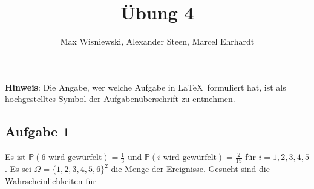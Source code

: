 \documentclass[11pt,a4paper,ngerman]{article}
\date{}
\title{Übung 4}
\author{Max Wisniewski\maxw, Alexander Steen\alex, Marcel Ehrhardt\marcel}
\newcommand{\set}[1]{ \{ #1 \}}
\newcommand{\Prob}{\mathbb{P}}
\begin{document}

\renewcommand{\figurename}{Figure}

\maketitle
\thispagestyle{fancy}

\begin{center}
\textbf{Hinweis}: Die Angabe, wer welche Aufgabe in \LaTeX\ formuliert hat, ist als hochgestelltes Symbol der Aufgabenüberschrift zu entnehmen.
\end{center}


\subsection*{Aufgabe 1}
Es ist $\Prob(\text{6 wird gewürfelt}) = \frac{1}{3}$ und $\Prob(\text{$i$ wird gewürfelt}) = \frac{2}{15}$ für $i = 1,2,3,4,5$. Es sei $\Omega = \set{1,2,3,4,5,6}^2$ die Menge der Ereignisse. Gesucht sind die Wahrscheinlichkeiten für
\end{document}
